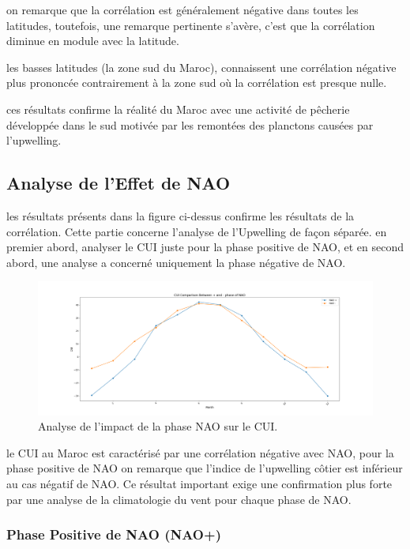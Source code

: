 on remarque que la corrélation est généralement négative dans toutes les latitudes, toutefois, une remarque pertinente s'avère, c'est que la corrélation diminue  en module avec la latitude.

les basses latitudes (la zone sud du Maroc), connaissent une corrélation négative plus prononcée contrairement à la zone sud où la corrélation est presque nulle.

ces résultats confirme la réalité du Maroc avec une activité de pêcherie développée dans le sud motivée par les remontées des planctons causées par l'upwelling. 

\subsection{Analyse de l'Effet de NAO}

les résultats présents dans la figure ci-dessus confirme les résultats de la corrélation. Cette partie concerne l'analyse de l'Upwelling de façon séparée. en premier abord, analyser le CUI juste pour la phase positive de NAO, et en second abord, une analyse a concerné uniquement la phase négative de NAO.

\begin{figure}[H]
\centering
\includegraphics[scale=0.3]{CUI_NAO_PHASES.png}
\caption{Analyse de l'impact de la phase NAO sur le CUI.}
\end{figure}

le CUI au Maroc est caractérisé par une corrélation négative avec NAO, pour la phase positive de NAO on remarque que l'indice de l'upwelling côtier est inférieur au cas négatif de NAO. Ce résultat important exige une confirmation plus forte par une analyse de la climatologie du vent pour chaque phase de NAO.



\subsubsection{Phase Positive de NAO (NAO+)}


